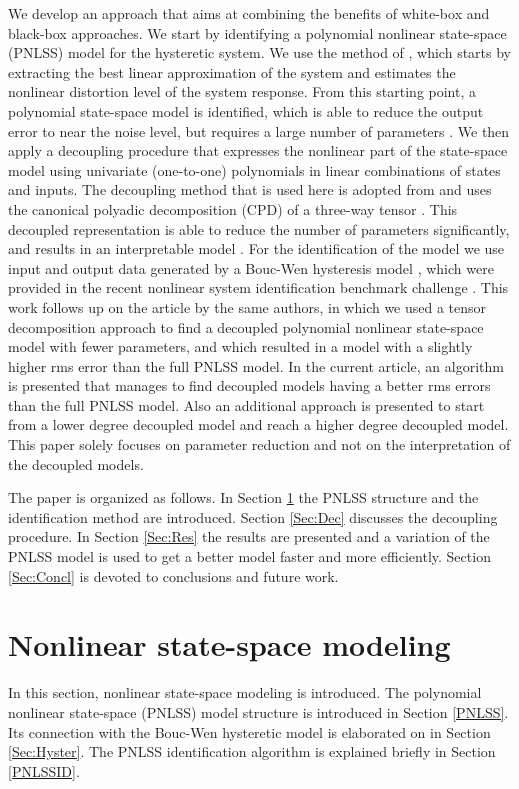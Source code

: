 \documentclass[review]{elsarticle}
\begin{document}
We develop an approach that aims at combining the benefits of white-box and black-box approaches. 
We start by identifying a polynomial nonlinear state-space (PNLSS) model for the hysteretic system. 
We use the method of \cite{Noel}, which starts by extracting the best linear approximation \cite{Johan1} of the system and estimates the nonlinear distortion level of the system response. 
From this starting point, a polynomial state-space model \cite{Paduart1} is identified, which is able to reduce the output error to near the noise level, but requires a large number of parameters \cite{Noel}. 
We then apply a decoupling procedure that expresses the nonlinear part of the state-space model using univariate (one-to-one) polynomials in linear combinations of states and inputs. 
The decoupling method that is used here is adopted from \citep{Philippe111} and uses the canonical polyadic decomposition (CPD) of a three-way tensor \citep{Carrol,Harshman,Kolda}.
This decoupled representation is able to reduce the number of parameters significantly, and results in an interpretable model \cite{Fakhrizadeh}.
For the identification of the model we use input and output data generated by a Bouc-Wen hysteresis model \cite{Bouc,wen1976method,Noel}, which were provided in the recent nonlinear system identification benchmark challenge \cite{Maarten}.
This work follows up on the article \citep{Fakhrizadeh} by the same authors, in which we used a tensor decomposition approach to find a decoupled polynomial nonlinear state-space model with fewer parameters, and which resulted in a model with a slightly higher rms error than the full PNLSS model. 
In the current article, an algorithm is presented that manages to find decoupled models having a better rms errors than the full PNLSS model. 
Also an additional approach is presented to start from a lower degree decoupled model and reach a higher degree decoupled model. This paper solely focuses on parameter reduction and not on the interpretation of the decoupled models.

The paper is organized as follows. 
In Section \ref{Sec:NLSS} the PNLSS structure and the identification method are introduced. 
Section \ref{Sec:Dec} discusses the decoupling procedure. 
In Section \ref{Sec:Res} the results are presented and a variation of the PNLSS model is used to get a better model faster and more efficiently. 
Section \ref{Sec:Concl} is devoted to conclusions and future work.




\section{Nonlinear state-space modeling}\label{Sec:NLSS}
In this section, nonlinear state-space modeling is introduced. The polynomial nonlinear state-space (PNLSS) model structure is introduced in Section \ref{PNLSS}. Its connection with the Bouc-Wen hysteretic model is elaborated on in Section \ref{Sec:Hyster}. The PNLSS identification algorithm is explained briefly in Section \ref{PNLSSID}.
\end{document}
